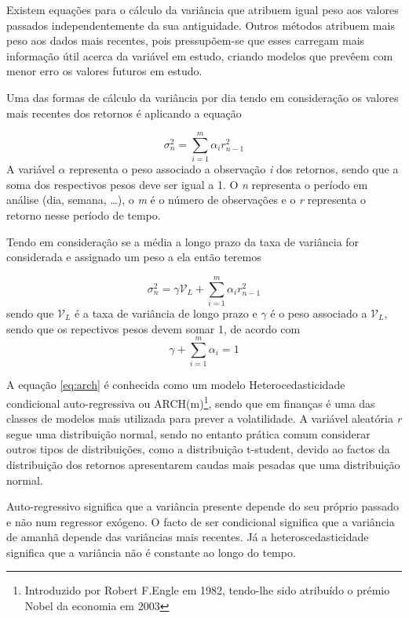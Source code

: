 \documentclass[
  12pt,
  a4paper,
  openany]{book}
\theoremstyle{definition}
\theoremstyle{definition}
\theoremstyle{definition}
\theoremstyle{remark}
\begin{document}
Existem equações para o cálculo da variância que atribuem igual peso aos valores passados independentemente da sua antiguidade. Outros métodos atribuem mais peso aos dados mais recentes, pois pressupõem-se que esses carregam mais informação útil acerca da variável em estudo, criando modelos que prevêem com menor erro os valores futuros em estudo.

Uma das formas de cálculo da variância por dia tendo em consideração os valores mais recentes dos retornos é aplicando a equação

\begin{equation} 
  \sigma_{n}^{2} =\sum_{i=1}^{m}\alpha_i r_{n-1}^{2}
  \label{eq:weight}
\end{equation}
A variável \(\alpha\) representa o peso associado a observação \emph{i} dos retornos, sendo que a soma dos respectivos pesos deve ser igual a 1. O \emph{n} representa o período em análise (dia, semana, \ldots), o \emph{m} é o número de observações e o \emph{r} representa o retorno nesse período de tempo.

Tendo em consideração \citet{Hull2018} se a média a longo prazo da taxa de variância for considerada e assignado um peso a ela então teremos

\begin{equation} 
  \sigma_{n}^{2} =\gamma\mathcal{V}_{L}+\sum_{i=1}^{m}\alpha_i r_{n-1}^{2}
  \label{eq:arch}
\end{equation}
sendo que \(\mathcal{V}_{L}\) é a taxa de variância de longo prazo e \(\gamma\) é o peso associado a \(\mathcal{V}_{L}\), sendo que os repectivos pesos devem somar 1, de acordo com \[\gamma + \sum_{i=1}^{m}\alpha_i = 1\]

A equação \eqref{eq:arch} é conhecida como um modelo Heterocedasticidade condicional auto-regressiva ou ARCH(m)\footnote{Introduzido por Robert F.Engle em 1982, tendo-lhe sido atribuído o prémio Nobel da economia em 2003}, sendo que em finanças é uma das classes de modelos mais utilizada para prever a volatilidade. A variável aleatória \emph{r} segue uma distribuição normal, sendo no entanto prática comum considerar outros tipos de distribuições, como a distribuição t-student, devido ao factos da distribuição dos retornos apresentarem caudas mais pesadas que uma distribuição normal.

Auto-regressivo significa que a variância presente depende do seu próprio passado e não num regressor exógeno. O facto de ser condicional significa que a variância de amanhã depende das variâncias mais recentes. Já a heteroscedasticidade significa que a variância não é constante ao longo do tempo.
\end{document}
